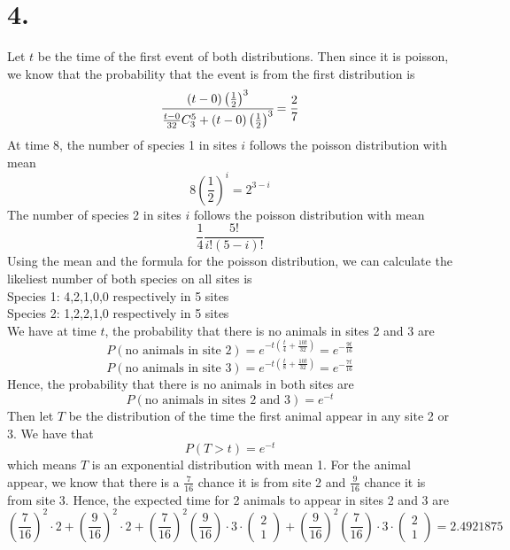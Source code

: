 \documentclass[11pt]{article}
\begin{document}
\section*{4.}
Let $t$ be the time of the first event of both distributions. Then since it is poisson, we know 
that the probability that the event is from the first distribution is 
\[
    \cfrac{(t-0)\left(\frac{1}{2}\right)^3}{\frac{t-0}{32} C^5_3 + (t-0)\left(\frac{1}{2}\right)^3} = \frac{2}{7}     
\]
At time 8, the number of species 1 in sites $i$ follows the poisson distribution with mean 
\[
    8 \left(\frac{1}{2}\right)^i = 2^{3-i}  
\]
The number of species 2 in sites $i$ follows the poisson distribution with mean 
\[
    \frac{1}{4} \frac{5!}{i!(5-i)!}
\]
Using the mean and the formula for the poisson distribution, we can calculate the likeliest 
number of both species on all sites is \\ 
Species 1: 4,2,1,0,0 respectively in 5 sites \\
Species 2: 1,2,2,1,0 respectively in 5 sites \\
We have at time $t$, the probability that there is no animals in sites 2 and 3 are 
\[
    P(\text{no animals in site 2}) = e^{-t\left(\frac{t}{4} + \frac{10t}{32}\right)} = e^{-\frac{9t}{16}}
\]
\[
    P(\text{no animals in site 3}) = e^{-t\left(\frac{t}{8} + \frac{10t}{32}\right)} = e^{-\frac{7t}{16}}
\]
Hence, the probability that there is no animals in both sites are 
\[
    P(\text{no animals in sites 2 and 3}) = e^{-t}    
\]
Then let $T$ be the distribution of the time the first animal appear in any site 2 or 3.
We have that 
\[
    P(T>t) = e^{-t}    
\]
which means $T$ is an exponential distribution with mean 1. For the animal appear, we know that
there is a $\frac{7}{16}$ chance it is from site 2 and $\frac{9}{16}$ chance it is from site 3. 
Hence, the expected time for 2 animals to appear in sites 2 and 3 are 
\[
    \left(\frac{7}{16}\right)^2 \cdot 2 + \left(\frac{9}{16}\right)^2 \cdot 2 
    + \left(\frac{7}{16}\right)^2 \left(\frac{9}{16}\right) \cdot 3 \cdot 
    \begin{pmatrix}
        2 \\
        1
    \end{pmatrix} 
    + \left(\frac{9}{16}\right)^2 \left(\frac{7}{16}\right) \cdot 3 \cdot 
    \begin{pmatrix}
        2 \\
        1
    \end{pmatrix} = 2.4921875
\]
\end{document}

